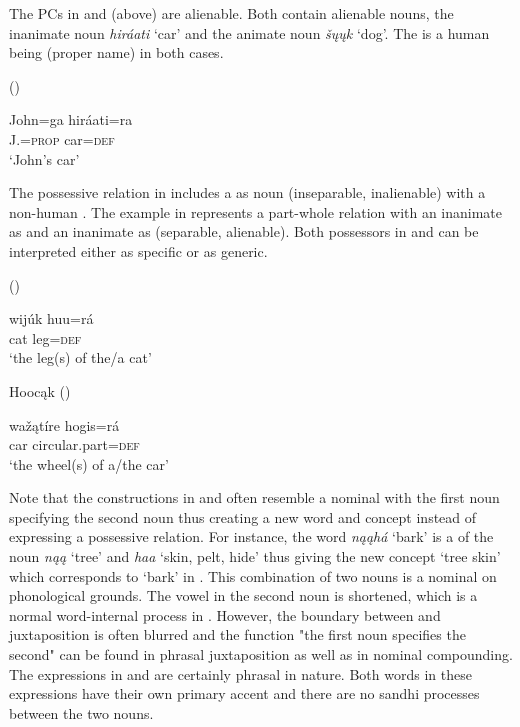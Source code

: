 \documentclass[output=paper]{LSP/langsci}
\begin{document}
The PCs in  and  (above) are alienable. Both contain alienable  nouns, the inanimate noun \textit{hiráati} `car' and the animate noun \textit{šųųk} `dog'. The  is a human being (proper name) in both cases. 

\ea {} (\citealt[13]{Helmbrecht2003}) \label{johnscar}

\gll John=ga      hiráati=ra \\
J.=\textsc{prop} car=\textsc{def} \\
\glt `John's car'
\z

The possessive relation in  includes a  as  noun (inseparable, inalienable) with a non-human . The example in  represents a part-whole relation with an inanimate  as  and an inanimate  as  (separable, alienable). Both possessors in  and  can be interpreted either as specific or as generic. 

\ea {} (\citealt[13]{Helmbrecht2003}) \label{leg}

\gll wijúk huu=rá \\
cat      leg=\textsc{def} \\
\glt `the leg(s) of the/a cat'
\z

\ea Hooc\k{a}k (\citealt[13]{Helmbrecht2003}) \label{wheel}

\gll waž\k{a}tíre hogis=rá \\
car  circular.part=\textsc{def} \\
\glt `the wheel(s) of a/the car'
\z

Note that the constructions in  and  often resemble a nominal  with the first noun specifying the second noun thus creating a new word and concept instead of expressing a possessive relation. For instance, the  word \textit{n\k{a}\k{a}h\'a} `bark' is a  of the noun \textit{n\k{a}\k{a}} `tree' and \textit{haa} `skin, pelt, hide' thus giving the new concept `tree skin' which corresponds to `bark' in . This combination of two nouns is a nominal  on phonological grounds. The vowel in the second noun is shortened, which is a normal word-internal process in . However, the boundary between  and juxtaposition is often blurred and the function "the first noun specifies the second" can be found in phrasal juxtaposition as well as in nominal compounding. The expressions in  and  are certainly phrasal in nature. Both words in these expressions have their own primary accent and there are no sandhi processes between the two nouns. 
\end{document}
